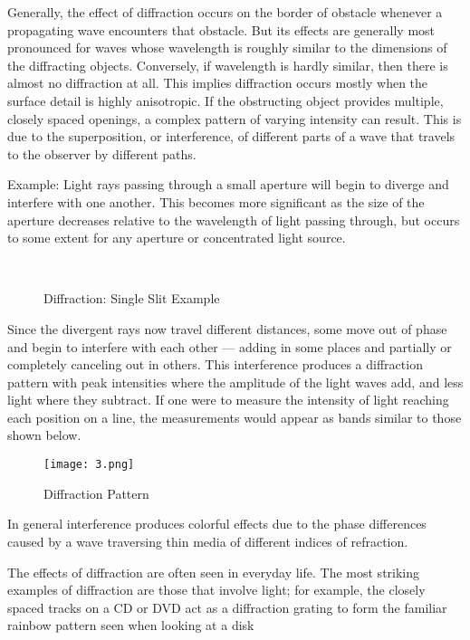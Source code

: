 Generally, the effect of diffraction occurs on the border of obstacle whenever a propagating wave encounters that obstacle. But its effects are generally most pronounced for waves whose wavelength is roughly similar to the dimensions of the diffracting objects. Conversely, if wavelength is hardly similar, then there is almost no diffraction at all. 
This implies diffraction occurs mostly when the surface detail is highly anisotropic. If the obstructing object provides multiple, closely spaced openings, a complex pattern of varying intensity can result. This is due to the superposition, or interference, of different parts of a wave that travels to the observer by different paths.

Example:
Light rays passing through a small aperture will begin to diverge and interfere with one another. This becomes more significant as the size of the aperture decreases relative to the wavelength of light passing through, but occurs to some extent for any aperture or concentrated light source.


\begin{figure}[H]
  \centering
~
  \label{diffractionSingleSlitExample}
  \caption{Diffraction: Single Slit Example}
\end{figure}


Since the divergent rays now travel different distances, some move out of phase and begin to interfere with each other — adding in some places and partially or completely canceling out in others. This interference produces a diffraction pattern with peak intensities where the amplitude of the light waves add, and less light where they subtract. If one were to measure the intensity of light reaching each position on a line, the measurements would appear as bands similar to those shown below.

\begin{figure}[H]
  \centering
  \texttt{[image: 3.png]}
  \label{diffractionSingleSlitPattern}
  \caption{Diffraction Pattern}
\end{figure}

In general interference produces colorful effects due to the phase differences caused by a wave traversing thin media of different indices of refraction.

The effects of diffraction are often seen in everyday life. The most striking examples of diffraction are those that involve light; for example, the closely spaced tracks on a CD or DVD act as a diffraction grating to form the familiar rainbow pattern seen when looking at a disk

